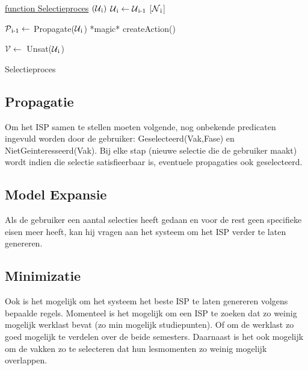 \begin{algorithm}
	\underline{function Selectieproces} $(\mathcal{U}\textsubscript{i})$ \;
	$\mathcal{U}\textsubscript{i} \leftarrow \mathcal{U}\textsubscript{i-1}$ [$\mathcal{N}\textsubscript{i}$]\;
		{
		$\mathcal{P}\textsubscript{i-1} \leftarrow$ Propagate($\mathcal{U}\textsubscript{i}$)\;
		*magic*\;
			{
			createAction()\;
			}
			{
			
			}
		}
		{
		$\mathcal{V} \leftarrow$ Unsat($\mathcal{U}\textsubscript{i}$)\; 
		}
	\caption{Selectieproces}
\end{algorithm}

\subsection{Propagatie}
Om het ISP samen te stellen moeten volgende, nog onbekende predicaten ingevuld worden door de gebruiker: Geselecteerd(Vak,Fase) en NietGeinteresseerd(Vak). Bij elke stap (nieuwe selectie die de gebruiker maakt) wordt indien die selectie satisfieerbaar is, eventuele propagaties ook geselecteerd. 

\subsection{Model Expansie}
Als de gebruiker een aantal selecties heeft gedaan en voor de rest geen specifieke eisen meer heeft, kan hij vragen aan het systeem om het ISP verder te laten genereren. 

\subsection{Minimizatie}
Ook is het mogelijk om het systeem het beste ISP te laten genereren volgens bepaalde regels. Momenteel is het mogelijk om een ISP te zoeken dat zo weinig mogelijk werklast bevat (zo min mogelijk studiepunten). Of om de werklast zo goed mogelijk te verdelen over de beide semesters. 
Daarnaast is het ook mogelijk om de vakken zo te selecteren dat hun lesmomenten zo weinig mogelijk overlappen. 



